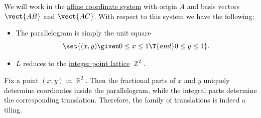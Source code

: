 \begin{defproof}
  We will work in the \hyperref[def:affine_coordinate_system]{affine coordinate system} with origin \( A \) and basis vectors \( \vect{AB} \) and \( \vect{AC} \). With respect to this system we have the following:
  \begin{itemize}
    \item The parallelogram is simply the unit square
    \begin{equation*}
      \set{ (x, y) \given 0 \leq x \leq 1 \T{and} 0 \leq y \leq 1 }.
    \end{equation*}

    \item \( L \) reduces to the \hyperref[def:integer_point_lattice]{integer point lattice} \( \BbbZ^2 \).
  \end{itemize}

  Fix a point \( (x, y) \) in \( \BbbR^2 \). Then the fractional parts of \( x \) and \( y \) uniquely determine coordinates inside the parallelogram, while the integral parts determine the corresponding translation. Therefore, the family of translations is indeed a tiling.
\end{defproof}

